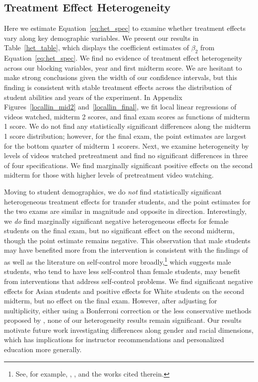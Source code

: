 \documentclass[12pt]{article}
\begin{document}
\subsection{Treatment Effect Heterogeneity}\label{subsec:heterogeneity}

Here we estimate Equation~\ref{eq:het_spec} to examine whether treatment effects vary along key demographic variables.
We present our results in Table~\ref{het_table}, which displays the coefficient estimates of $\beta_2$ from Equation~\ref{eq:het_spec}.
We find no evidence of treatment effect heterogeneity across our blocking variables, year and first midterm score.
We are hesitant to make strong conclusions given the width of our confidence intervals, but this finding is consistent with stable treatment effects across the distribution of student abilities and years of the experiment.
In Appendix Figures~\ref{locallin_mid2} and~\ref{locallin_final}, we fit local linear regressions of videos watched, midterm 2 scores, and final exam scores as functions of midterm 1 score.
We do not find any statistically significant differences along the midterm 1 score distribution;
however, for the final exam, the point estimates are largest for the bottom quarter of midterm 1 scorers.
Next, we examine heterogeneity by levels of videos watched pretreatment and find no significant differences in three of four specifications.
We find marginally significant positive effects on the second midterm for those with higher levels of pretreatment video watching.

Moving to student demographics, we do \textit{not} find statistically significant heterogeneous treatment effects for transfer students, and the point estimates for the two exams are similar in magnitude and opposite in direction.
Interestingly, we \textit{do} find marginally significant negative heterogeneous effects for female students on the final exam, but no significant effect on the second midterm, though the point estimate remains negative.
This observation that male students may have benefited more from the intervention is consistent with the findings of \textcite{cgpr2020} as well as the literature on self-control more broadly,\footnote{See, for example, \textcite{ds2006}, \textcite{dsmpzd2015}, and the works cited therein.} which suggests male students, who tend to have less self-control than female students, may benefit from interventions that address self-control problems.
We find significant negative effects for Asian students and positive effects for White students on the second midterm, but no effect on the final exam.
However, after adjusting for multiplicity, either using a Bonferroni correction or the less conservative methods proposed by \textcite{lsx2019}, none of our heterogeneity results remain significant.
Our results motivate future work investigating differences along gender and racial dimensions, which has implications for instructor recommendations and personalized education more generally.
\end{document}
